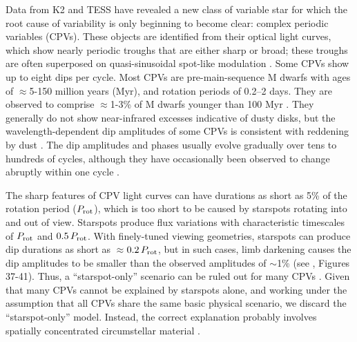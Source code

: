 \documentclass[11pt,twocolumn,tighten,linenumbers]{aastex63}
\begin{document}
Data from K2 \citep{2014PASP..126..398H} and TESS
\citep{2015JATIS...1a4003R} have revealed a new class of variable star
for which the root cause of variability is only beginning to become
clear: complex periodic variables (CPVs).  These objects are
identified from their optical light curves, which show nearly periodic
troughs that are either sharp or broad; these troughs are often
superposed on quasi-sinusoidal spot-like modulation
\citep{2017AJ....153..152S,2018AJ....155...63S,2019ApJ...876..127Z}.
Some CPVs show up to eight dips per cycle.  Most CPVs are
pre-main-sequence M dwarfs with ages of $\approx$5-150 million years
(Myr), and rotation periods of 0.2--2 days.  They are observed to
comprise $\approx$1-3\% of M dwarfs younger than 100 Myr
\citep{2016AJ....152..114R,2022AJ....163..144G}.  They generally do
not show near-infrared excesses indicative of dusty disks, but the
wavelength-dependent dip amplitudes of some CPVs is consistent with
reddening by dust
\citep{2017PASJ...69L...2O,2020AJ....160...86B,2022AJ....163..144G,2023MNRAS.518.2921K}.
The dip amplitudes and phases usually evolve gradually over tens to
hundreds of cycles, although they have occasionally been observed to
change abruptly within one cycle
\citep[e.g.][]{2017AJ....153..152S,2022ApJ...925...75P,2023ApJ...945..114P}.

The sharp features of CPV light curves can have durations as short as
5\% of the rotation period ($P_{\rm rot}$), which is too short to be
caused by starspots rotating into and out of view.  Starspots produce
flux variations with characteristic timescales of $P_{\rm rot}$ and
$0.5\,P_{\rm rot}$.  With finely-tuned viewing geometries, starspots
can produce dip durations as short as $\approx$$0.2\,P_{\rm rot}$, but
in such cases, limb darkening causes the dip amplitudes to be smaller
than the observed amplitudes of $\sim$1\% (see
\citealt{2017AJ....153..152S}, Figures 37-41).  Thus, a
``starspot-only'' scenario can be ruled out for many CPVs
\citep{2017AJ....153..152S,2019ApJ...876..127Z,2021MNRAS.500.1366K}.
Given that many CPVs cannot be explained by starspots alone, and
working under the assumption that all CPVs share the same basic
physical scenario, we discard the ``starspot-only'' model.
Instead, the correct explanation probably involves spatially
concentrated circumstellar material
\citep[e.g.][]{2017AJ....153..152S,2022AJ....163..144G}.
\end{document}

